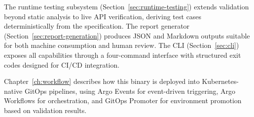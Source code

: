 The runtime testing subsystem (Section~\ref{sec:runtime-testing}) extends validation beyond static analysis to live API verification, deriving test cases deterministically from the specification. The report generator (Section~\ref{sec:report-generation}) produces JSON and Markdown outputs suitable for both machine consumption and human review. The CLI (Section~\ref{sec:cli}) exposes all capabilities through a four-command interface with structured exit codes designed for CI/CD integration.

Chapter~\ref{ch:workflow} describes how this binary is deployed into Kubernetes-native GitOps pipelines, using Argo Events for event-driven triggering, Argo Workflows for orchestration, and GitOps Promoter for environment promotion based on validation results.
